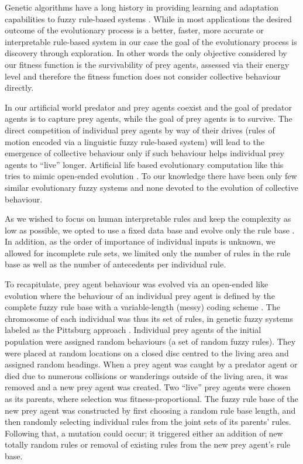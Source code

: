 Genetic algorithms have a long history in providing learning and adaptation capabilities to fuzzy rule-based systems \cite{herrera2008genetic,fazzolari2013review}. While in most applications the desired outcome of the evolutionary process is a better, faster, more accurate or interpretable rule-based system \cite{casillias2003accuracy,casillias2003interpretability,cordon2011historical} in our case the goal of the evolutionary process is discovery through exploration. In other words the only objective considered by our fitness function is the survivability of prey agents, assessed via their energy level and therefore the fitness function does not consider collective behaviour directly.

In our artificial world predator and prey agents coexist and the goal of predator agents is to capture prey agents, while the goal of prey agents is to survive. The direct competition of individual prey agents by way of their drives (\ie rules of motion encoded via a linguistic fuzzy rule-based system) will lead to the emergence of collective behaviour only if such behaviour helps individual prey agents to ``live'' longer. Artificial life based evolutionary computation like this tries to mimic open-ended evolution \cite{aguilar2014thepast,mitchell1994genetic,soros2014identifying}. To our knowledge there have been only few similar evolutionary fuzzy systems \cite{barriosrolania2015bacterially,halavati2005fuzzy} and none devoted to the evolution of collective behaviour.

As we wished to focus on human interpretable rules and keep the complexity as low as possible, we opted to use a fixed data base and evolve only the rule base \cite{cordon2004ten}. In addition, as the order of importance of individual inputs is unknown, we allowed for incomplete rule sets, \ie we limited only the number of rules in the rule base as well as the number of antecedents per individual rule.

To recapitulate, prey agent behaviour was evolved via an open-ended like evolution where the behaviour of an individual prey agent is defined by the complete fuzzy rule base with a variable-length (messy) coding scheme \cite{hoffman1997evolutionary}. The chromosome of each individual was thus its set of rules, in genetic fuzzy systems labeled as the Pittsburg approach \cite{herrera2008genetic}. Individual prey agents of the initial population were assigned random behaviours (\ie a set of random fuzzy rules). They were placed at random locations on a closed disc centred to the living area and assigned random headings. When a prey agent was caught by a predator agent or died due to numerous collisions or wanderings outside of the living area, it was removed and a new prey agent was created. Two ``live'' prey agents were chosen as its parents, where selection was fitness-proportional. The fuzzy rule base of the new prey agent was constructed by first choosing a random rule base length, and then randomly selecting individual rules from the joint sets of its parents' rules. Following that, a mutation could occur; it triggered either an addition of new totally random rules or removal of existing rules from the new prey agent's rule base.

